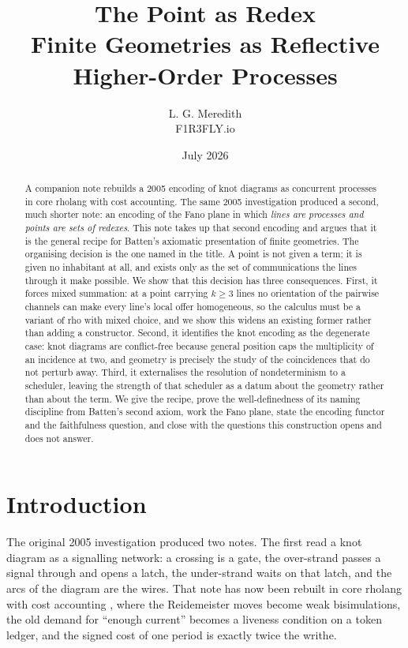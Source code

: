 \documentclass[11pt]{article}
\title{The Point as Redex\\[2pt]
\large Finite Geometries as Reflective Higher-Order Processes}
\author{L. G. Meredith\\ \small F1R3FLY.io}
\date{July 2026}
\theoremstyle{plain}
\theoremstyle{definition}
\theoremstyle{remark}
\begin{document}
\maketitle

\begin{abstract}
A companion note rebuilds a 2005 encoding of knot diagrams as concurrent processes in
core rholang with cost accounting. The same 2005 investigation produced a second, much
shorter note: an encoding of the Fano plane in which \emph{lines are processes and points
are sets of redexes}. This note takes up that second encoding and argues that it is the
general recipe for Batten's axiomatic presentation of finite geometries. The organising
decision is the one named in the title. A point is not given a term; it is given no
inhabitant at all, and exists only as the set of communications the lines through it make
possible. We show that this decision has three consequences. First, it forces mixed
summation: at a point carrying $k \geq 3$ lines no orientation of the pairwise channels
can make every line's local offer homogeneous, so the calculus must be a variant of rho
with mixed choice, and we show this widens an existing former rather than adding a
constructor. Second, it identifies the knot encoding as the degenerate case: knot diagrams
are conflict-free because general position caps the multiplicity of an incidence at two,
and geometry is precisely the study of the coincidences that do not perturb away. Third,
it externalises the resolution of nondeterminism to a scheduler, leaving the strength of
that scheduler as a datum about the geometry rather than about the term. We give the
recipe, prove the well-definedness of its naming discipline from Batten's second axiom,
work the Fano plane, state the encoding functor and the faithfulness question, and close
with the questions this construction opens and does not answer.
\end{abstract}

\section{Introduction}

The original 2005 investigation \cite{Knots05} produced two notes. The first read a knot
diagram as a signalling network: a crossing is a gate, the over-strand passes a signal
through and opens a latch, the under-strand waits on that latch, and the arcs of the
diagram are the wires. That note has now been rebuilt in core rholang with cost
accounting \cite{KnotsNote}, where the Reidemeister moves become weak bisimulations, the
old demand for ``enough current'' becomes a liveness condition on a token ledger, and the
signed cost of one period is exactly twice the writhe.
\end{document}

